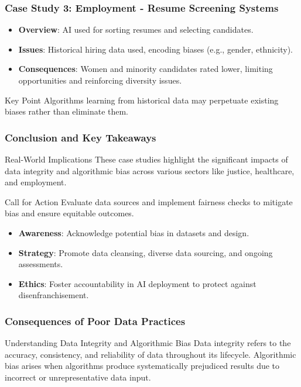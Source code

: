 \documentclass{beamer}
\begin{document}
\begin{frame}[fragile]
    \frametitle{Case Study 3: Employment - Resume Screening Systems}
    
    \begin{itemize}
        \item \textbf{Overview}: AI used for sorting resumes and selecting candidates.
        \item \textbf{Issues}: Historical hiring data used, encoding biases (e.g., gender, ethnicity).
        \item \textbf{Consequences}: Women and minority candidates rated lower, limiting opportunities and reinforcing diversity issues.
    \end{itemize}
    
    \begin{block}{Key Point}
        Algorithms learning from historical data may perpetuate existing biases rather than eliminate them.
    \end{block}
\end{frame}

\begin{frame}[fragile]
    \frametitle{Conclusion and Key Takeaways}
    
    \begin{block}{Real-World Implications}
        These case studies highlight the significant impacts of data integrity and algorithmic bias across various sectors like justice, healthcare, and employment.
    \end{block}
    
    \begin{block}{Call for Action}
        Evaluate data sources and implement fairness checks to mitigate bias and ensure equitable outcomes.
    \end{block}

    \begin{itemize}
        \item \textbf{Awareness}: Acknowledge potential bias in datasets and design.
        \item \textbf{Strategy}: Promote data cleansing, diverse data sourcing, and ongoing assessments.
        \item \textbf{Ethics}: Foster accountability in AI deployment to protect against disenfranchisement.
    \end{itemize}
\end{frame}

\begin{frame}[fragile]
    \frametitle{Consequences of Poor Data Practices}
    \begin{block}{Understanding Data Integrity and Algorithmic Bias}
        Data integrity refers to the accuracy, consistency, and reliability of data throughout its lifecycle. Algorithmic bias arises when algorithms produce systematically prejudiced results due to incorrect or unrepresentative data input.
    \end{block}
\end{frame}
\end{document}
